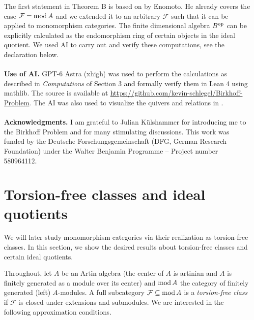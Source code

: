 \documentclass[a4paper]{amsart}
\newcommand{\op}{\textnormal{op}}
\renewcommand{\mod}{\textnormal{mod}\,}
\numberwithin{equation}{section} \theoremstyle{plain}
\numberwithin{thm}{section}
\begin{document}
The first statement in Theorem B is based on \cite[Theorem 5.1]{enomoto} by Enomoto. He already covers the case $\mathcal{F} = \mod A$ and we extended it to an arbitrary $\mathcal{F}$ such that it can be applied to monomorphism categories. The finite dimensional algebra $B^\op$ can be explicitly calculated as the endomorphism ring of certain objects in the ideal quotient. We used AI to carry out and verify these computations, see the declaration below.
\\
\\
\textbf{Use of AI.} GPT-6 Astra (xhigh) was used to perform the calculations as described in \emph{Computations} of Section 3 and formally verify them in Lean 4 using mathlib. The source is available at \href{https://github.com/kevin-schlegel/Birkhoff-Problem}{https://github.com/kevin-schlegel/Birkhoff-Problem}. The AI was also used to visualize the quivers and relations in .\\
\\
\textbf{Acknowledgments.} I am grateful to Julian K\"ulshammer for introducing me to the Birkhoff Problem and for many stimulating discussions. This work was funded by the Deutsche Forschungsgemeinschaft (DFG, German Research Foundation) under the Walter Benjamin Programme -- Project number 580964112.

\section{Torsion-free classes and ideal quotients}
We will later study monomorphism categories via their realization as torsion-free classes. In this section, we show the desired results about torsion-free classes and certain ideal quotients. 

Throughout, let $A$ be an Artin algebra (the center of $A$ is artinian and $A$ is finitely generated as a module over its center) and $\mod A$ the category of finitely generated (left) $A$-modules. A full subcategory $\mathcal{F} \subseteq \mod A$ is a \emph{torsion-free class} if $\mathcal{F}$ is closed under extensions and submodules. We are interested in the following approximation conditions.
\end{document}
